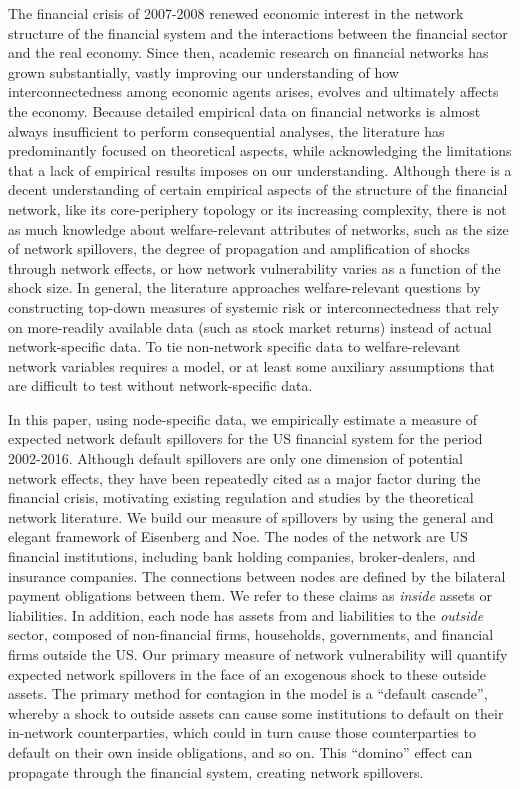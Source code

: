 
The financial crisis of 2007-2008 renewed economic interest in the network structure of the financial system and the interactions between the financial sector and the real economy. Since then, academic research on financial networks has grown substantially, vastly improving our understanding of how interconnectedness among economic agents arises, evolves and ultimately affects the economy. Because detailed empirical data on financial networks is almost always insufficient to perform consequential analyses, the literature has predominantly focused on theoretical aspects, while acknowledging the limitations that a lack of empirical results imposes on our understanding. Although there is a decent understanding of certain empirical aspects of the structure of the financial network, like its core-periphery topology or its increasing complexity, there is not as much knowledge about welfare-relevant attributes of networks, such as the size of network spillovers, the degree of propagation and amplification of shocks through network effects, or how network vulnerability varies as a function of the shock size. In general, the literature approaches welfare-relevant questions by constructing top-down measures of systemic risk or interconnectedness that rely on more-readily available data (such as stock market returns) instead of actual network-specific data. To tie non-network specific data to welfare-relevant network variables requires a model, or at least some auxiliary assumptions that are difficult to test without network-specific data.

In this paper, using node-specific data, we empirically estimate a measure of expected network default spillovers for the US financial system for the period 2002-2016. Although default spillovers are only one dimension of potential network effects, they have been repeatedly cited as a major factor during the financial crisis, motivating existing regulation and studies by the theoretical network literature. We build our measure of spillovers by using the general and elegant framework of Eisenberg and Noe. The nodes of the network are US financial institutions, including bank holding companies, broker-dealers, and insurance companies. The connections between nodes are defined by the bilateral payment obligations between them. We refer to these claims as \textit{inside} assets or liabilities. In addition, each node has assets from and liabilities to the \textit{outside} sector, composed of non-financial firms, households, governments, and financial firms outside the US. Our primary measure of network vulnerability will quantify expected network spillovers in the face of an exogenous shock to these outside assets. The primary method for contagion in the model is a ``default cascade'', whereby a shock to outside assets can cause some institutions to default on their in-network counterparties, which could in turn cause those counterparties to default on their own inside obligations, and so on. This “domino” effect can propagate through the financial system, creating network spillovers.

